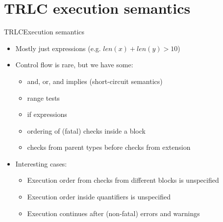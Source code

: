 \documentclass[aspectratio=169]{beamer}
\begin{document}
\section{TRLC execution semantics}

\begin{frame}{TRLC}{Execution semantics}
  \begin{itemize}
  \item Mostly just expressions (e.g. $len(x) + len(y) > 10$)
  \item Control flow is rare, but we have some:
    \begin{itemize}
    \item and, or, and implies (short-circuit semantics)
    \item range tests
    \item if expressions
    \item ordering of (fatal) checks inside a block
    \item checks from parent types before checks from extension
    \end{itemize}
  \item Interesting cases:
    \begin{itemize}
    \item Execution order from checks from different blocks is unspecified
    \item Execution order inside quantifiers is unspecified
    \item Execution continues after (non-fatal) errors and warnings
    \end{itemize}
  \end{itemize}
\end{frame}
\end{document}
